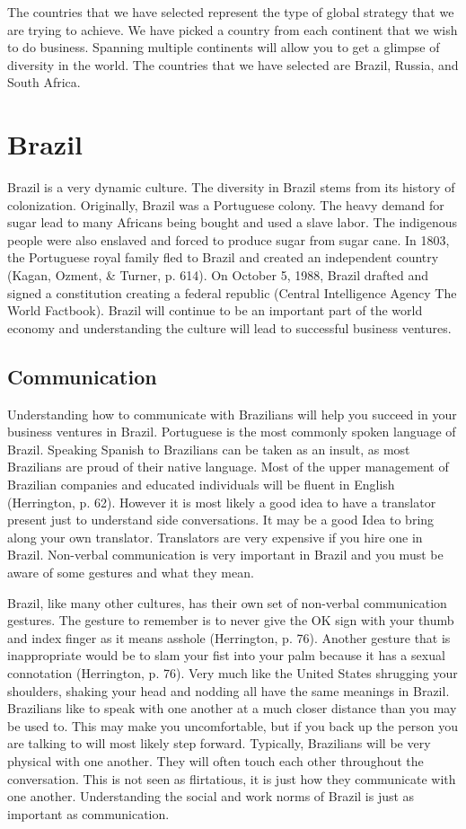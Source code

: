 \documentclass[11pt,a4paper,twoside]{report}
\begin{document}
The countries that we have selected represent the type of global strategy that
we are trying to achieve. We have picked a country from each continent that we
wish to do business. Spanning multiple continents will allow you to get a
glimpse of diversity in the world. The countries that we have selected are
Brazil, Russia, and South Africa.

\chapter{Brazil}

Brazil is a very dynamic culture. The diversity in Brazil stems from its
history of colonization. Originally, Brazil was a Portuguese colony.  The
heavy demand for sugar lead to many Africans being bought and used a slave
labor. The indigenous people were also enslaved and forced to produce sugar
from sugar cane. In 1803, the Portuguese royal family fled to Brazil and
created an independent country (Kagan, Ozment, \& Turner, p. 614). On
October 5, 1988, Brazil drafted and signed a constitution creating a
federal republic (Central Intelligence Agency The World Factbook). Brazil
will continue to be an important part of the world economy and
understanding the culture will lead to successful business ventures.

\section{Communication}

Understanding how to communicate with Brazilians will help you succeed in
your business ventures in Brazil. Portuguese is the most commonly spoken
language of Brazil. Speaking Spanish to Brazilians can be taken as an
insult, as most Brazilians are proud of their native language.  Most of the
upper management of Brazilian companies and educated individuals will be
fluent in English (Herrington, p. 62). However it is most likely a good
idea to have a translator present just to understand side conversations. It
may be a good Idea to bring along your own translator. Translators are very
expensive if you hire one in Brazil. Non-verbal communication is very
important in Brazil and you must be aware of some gestures and what they
mean.

Brazil, like many other cultures, has their own set of non-verbal communication
gestures. The gesture to remember is to never give the OK sign with your thumb
and index finger as it means asshole (Herrington, p. 76). Another gesture that
is inappropriate would be to slam your fist into your palm because it has a
sexual connotation (Herrington, p. 76). Very much like the United States
shrugging your shoulders, shaking your head and nodding all have the same
meanings in Brazil.  Brazilians like to speak with one another at a much closer
distance than you may be used to. This may make you uncomfortable, but if you
back up the person you are talking to will most likely step forward. Typically,
Brazilians will be very physical with one another. They will often touch each
other throughout the conversation. This is not seen as flirtatious, it is just
how they communicate with one another. Understanding the social and work norms
of Brazil is just as important as communication.
\end{document}
